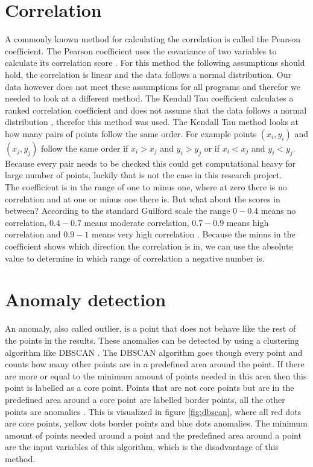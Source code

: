 \section{Correlation}
A commonly known method for calculating the correlation is called the Pearson coefficient. The Pearson coefficient uses the covariance of two variables to calculate its correlation score \cite{pearson1929some}. For this method the following assumptions should hold, the correlation is linear and the data follows a normal distribution. Our data however does not meet these assumptions for all programs and therefor we needed to look at a different method. The Kendall Tau coefficient calculates a ranked correlation coefficient and does not assume that the data follows a normal distribution \cite{kendall1938new}, therefor this method was used. The Kendall Tau method looks at how many pairs of points follow the same order. For example points $(x_i, y_i)$ and $(x_j, y_j)$ follow the same order if $x_i > x_j$ and $y_i > y_j$ or if $x_i < x_j$ and $y_i < y_j$. Because every pair needs to be checked this could get computational heavy for large number of points, luckily that is not the case in this research project.\\

The coefficient is in the range of one to minus one, where at zero there is no correlation and at one or minus one there is. But what about the scores in between? According to the standard Guilford scale the range $0-0.4$ means no correlation, $0.4-0.7$ means moderate correlation, $0.7-0.9$ means high correlation and $0.9-1$ means very high correlation \cite{sandler1957jp}. Because the minus in the coefficient shows which direction the correlation is in, we can use the absolute value to determine in which range of correlation a negative number is. 

\section{Anomaly detection}
An anomaly, also called outlier, is a point that does not behave like the rest of the points in the results. These anomalies can be detected by using a clustering algorithm like DBSCAN \cite{chandola2009anomaly}. The DBSCAN algorithm goes though every point and counts how many other points are in a predefined area around the point. If there are more or equal to the minimum amount of points needed in this area then this point is labelled as a core point. Points that are not core points but are in the predefined area around a core point are labelled border points, all the other points are anomalies \cite{ester1996density}. This is visualized in figure \ref{fig:dbscan}, where all red dots are core points, yellow dots border points and blue dots anomalies. The minimum amount of points needed around a point and the predefined area around a point are the input variables of this algorithm, which is the disadvantage of this method.

